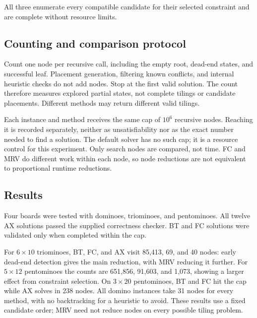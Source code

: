 \documentclass[UTF8,fontset=fandol,11pt,a4paper]{ctexart}
\begin{document}
All three enumerate every compatible candidate for their selected constraint
and are complete without resource limits.

\subsection{Counting and comparison protocol}
Count one node per recursive call, including the empty root, dead-end states,
and successful leaf. Placement generation, filtering known conflicts, and
internal heuristic checks do not add nodes. Stop at the first valid solution.
The count therefore measures explored partial states, not complete tilings
or candidate placements. Different methods may return different valid tilings.

Each instance and method receives the same cap of $10^6$ recursive nodes.
Reaching it is recorded separately, neither as unsatisfiability nor as the
exact number needed to find a solution. The default solver has no such cap;
it is a resource control for this experiment. Only search nodes are compared,
not time. FC and MRV do different work within each node, so node reductions
are not equivalent to proportional runtime reductions.

\clearpage
\subsection{Results}
Four boards were tested with dominoes, triominoes, and pentominoes. All twelve
AX solutions passed the supplied correctness checker. BT and FC solutions
were validated only when completed within the cap.

\begin{table}[htbp]
  \centering\small
  \caption{Search nodes for three policies sharing the same candidates.}\label{tab:csp}
  
\end{table}


\begin{table}[htbp]
  \centering\small
  \caption{Completion within the same node budget, across twelve instances.}
  
\end{table}

For $6\times10$ triominoes, BT, FC, and AX visit 85,413, 69, and 40 nodes:
early dead-end detection gives the main reduction, with MRV reducing it further.
For $5\times12$ pentominoes the counts are 651,856, 91,603, and 1,073,
showing a larger effect from constraint selection. On $3\times20$ pentominoes,
BT and FC hit the cap while AX solves in 238 nodes. All domino instances
take 31 nodes for every method, with no backtracking for a heuristic to avoid.
These results use a fixed candidate order; MRV need not reduce nodes on
every possible tiling problem.
\end{document}
